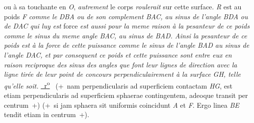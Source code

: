 {
ou à sa touchante en \textit{O}, \textit{autrement} le corps \textit{roulerait} sur cette surface.
\textit{R} est au poids \textit{F} \textit{comme le}
\textit{\textit{DBA} ou de son complement \textit{BAC}, au sinus de l'angle
\textit{BDA} ou de \textit{DAC} qui luy est}
force \textit{est aussi pour la meme raison à la pesanteur de ce poids
comme le sinus du meme angle \textit{BAC}, au sinus de \textit{BAD}.
Ainsi la pesanteur de ce poids est à la force de cette puissance comme le sinus
de l'angle \textit{BAD} au sinus de l'angle \textit{DAC},
et par consequent ce poids et cette puissance sont entre eux 
en raison reciproque des sinus des angles que font leur lignes de direction
avec la ligne tirée de leur point de concours perpendiculairement
à la surface \textit{GH}, telle qu'elle soit.}}{%
%
}
\pend
\pstart
\href{\Scan{LH_37_05_218r}}%
{~r\textsuperscript{o}\rbrack}\ 
%
(+~nam perpendicularis ad superficiem contactam \textit{HG}, 
est etiam perpendicularis ad superficiem sphaerae contingentem,
adeoque transit per centrum~\lbrack+\rbrack)
(+~si jam sphaera sit uniformis coincidunt \textit{A} et \textit{F}. 
Ergo linea \textit{BE} tendit etiam in centrum~+).
